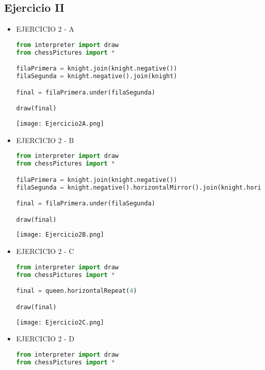 \documentclass{article}
\begin{document}
	\subsection{Ejercicio II}
	\begin{itemize}	
 
		\item EJERCICIO 2 - A

            \begin{lstlisting}[language=Python, caption=EJERCICIO 2-A]
from interpreter import draw
from chessPictures import *

filaPrimera = knight.join(knight.negative())
filaSegunda = knight.negative().join(knight)

final = filaPrimera.under(filaSegunda)

draw(final)
            \end{lstlisting}  
            \texttt{[image: Ejercicio2A.png]}
            
            \item EJERCICIO 2 - B

            \begin{lstlisting}[language=Python, caption=EJERCICIO 2-B]
from interpreter import draw
from chessPictures import *

filaPrimera = knight.join(knight.negative())
filaSegunda = knight.negative().horizontalMirror().join(knight.horizontalMirror())

final = filaPrimera.under(filaSegunda)

draw(final)
            \end{lstlisting} 
            \texttt{[image: Ejercicio2B.png]}
            
            \item EJERCICIO 2 - C

            \begin{lstlisting}[language=Python, caption=EJERCICIO 2-C]
from interpreter import draw
from chessPictures import *

final = queen.horizontalRepeat(4)

draw(final)
            \end{lstlisting}  
            \texttt{[image: Ejercicio2C.png]}
            
            \item EJERCICIO 2 - D
            
            \begin{lstlisting}[language=Python, caption=EJERCICIO 2-D]
from interpreter import draw
from chessPictures import *


\end{lstlisting}
\end{itemize}
\end{document}
